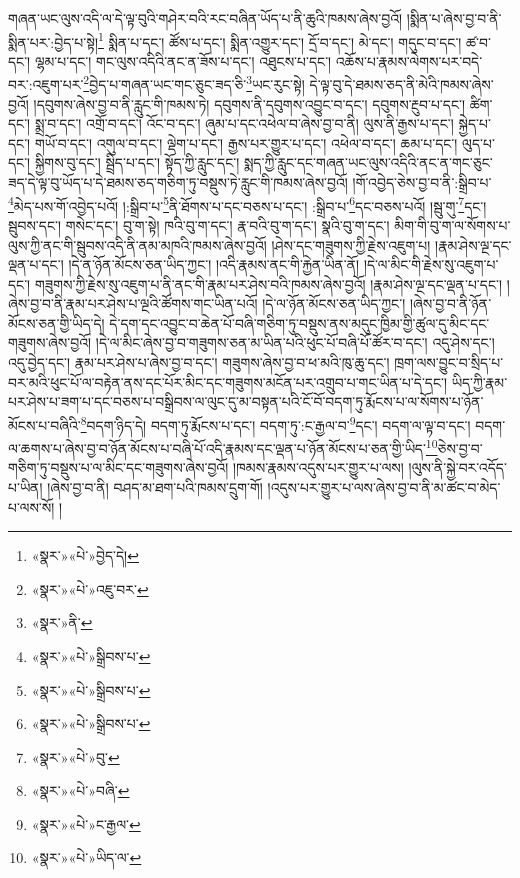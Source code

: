 གཞན་ཡང་ལུས་འདི་ལ་དེ་ལྟ་བུའི་གཤེར་བའི་རང་བཞིན་ཡོད་པ་ནི་ཆུའི་ཁམས་ཞེས་བྱའོ། །སྨིན་པ་ཞེས་བྱ་བ་ནི་སྨིན་པར་:བྱེད་པ་སྟེ།\footnote{«སྣར་»«པེ་»བྱེད་དེ།} སྨིན་པ་དང་། ཚོས་པ་དང་། སྨིན་འགྱུར་དང་། དྲོ་བ་དང་། མེ་དང་། གདུང་བ་དང་། ཚ་བ་དང་། ལྷམ་པ་དང་། གང་ལུས་འདིའི་ནང་ན་ཟོས་པ་དང་། འཐུངས་པ་དང་། འཆོས་པ་རྣམས་ལེགས་པར་བདེ་བར་:འཇུག་པར་\footnote{«སྣར་»«པེ་»འཇུ་བར་}བྱེད་པ་གཞན་ཡང་གང་ཅུང་ཟད་ཅི་\footnote{«སྣར་»ནི་}ཡང་རུང་སྟེ། དེ་ལྟ་བུ་དེ་ཐམས་ཅད་ནི་མེའི་ཁམས་ཞེས་བྱའོ། །དབུགས་ཞེས་བྱ་བ་ནི་རླུང་གི་ཁམས་ཏེ། དབུགས་ནི་དབུགས་འབྱུང་བ་དང་། དབུགས་རྔུབ་པ་དང་། ཚིག་དང་། སྨྲ་བ་དང་། འགྲོ་བ་དང་། འོང་བ་དང་། ཞུམ་པ་དང་འཕེལ་བ་ཞེས་བྱ་བ་ནི། ལུས་ནི་རྒྱས་པ་དང་། སྐྱེད་པ་དང་། གཡོ་བ་དང་། འགུལ་བ་དང་། ལྡེག་པ་དང་། རྒྱས་པར་གྱུར་པ་དང་། འཕེལ་བ་དང་། ཆམ་པ་དང་། ལུད་པ་དང་། སྐྱིགས་བུ་དང་། སྦྲིད་པ་དང་། སྟོད་ཀྱི་རླུང་དང་། སྨད་ཀྱི་རླུང་དང་གཞན་ཡང་ལུས་འདིའི་ནང་ན་གང་ཅུང་ཟད་དེ་ལྟ་བུ་ཡོད་པ་དེ་ཐམས་ཅད་གཅིག་ཏུ་བསྡུས་ཏེ་རླུང་གི་ཁམས་ཞེས་བྱའོ། །གོ་འབྱེད་ཅེས་བྱ་བ་ནི་:སྒྲིབ་པ་\footnote{«སྣར་»«པེ་»སྒྲིབས་པ་}མེད་པས་གོ་འབྱེད་པའོ། །:སྒྲིབ་པ་\footnote{«སྣར་»«པེ་»སྒྲིབས་པ་}ནི་ཐོགས་པ་དང་བཅས་པ་དང་། :སྒྲིབ་པ་\footnote{«སྣར་»«པེ་»སྒྲིབས་པ་}དང་བཅས་པའོ། །སྦུ་གུ་\footnote{«སྣར་»«པེ་»བུ་}དང་། སྦུབས་དང་། གསེང་དང་། བུ་ག་སྟེ། ཁའི་བུ་ག་དང་། རྣ་བའི་བུ་ག་དང་། སྣའི་བུ་ག་དང་། མིག་གི་བུ་ག་ལ་སོགས་པ་ལུས་ཀྱི་ནང་གི་སྦུབས་འདི་ནི་ནམ་མཁའི་ཁམས་ཞེས་བྱའོ། །ཤེས་དང་གཟུགས་ཀྱི་རྗེས་འཇུག་པ། །རྣམ་ཤེས་ལྔ་དང་ལྡན་པ་དང་། །དེ་ན་ཉོན་མོངས་ཅན་ཡིད་ཀྱང་། །འདི་རྣམས་ནང་གི་རྐྱེན་ཡིན་ནོ། །དེ་ལ་མིང་གི་རྗེས་སུ་འཇུག་པ་དང་། གཟུགས་ཀྱི་རྗེས་སུ་འཇུག་པ་ནི་ནང་གི་རྣམ་པར་ཤེས་བའི་ཁམས་ཞེས་བྱའོ། །རྣམ་ཤེས་ལྔ་དང་ལྡན་པ་དང་། །ཞེས་བྱ་བ་ནི་རྣམ་པར་ཤེས་པ་ལྔའི་ཚོགས་གང་ཡིན་པའོ། །དེ་ལ་ཉོན་མོངས་ཅན་ཡིད་ཀྱང་། །ཞེས་བྱ་བ་ནི་ཉོན་མོངས་ཅན་གྱི་ཡིད་དེ། དེ་དག་དང་འབྱུང་བ་ཆེན་པོ་བཞི་གཅིག་ཏུ་བསྡུས་ནས་མདུང་ཁྱིམ་གྱི་ཚུལ་དུ་མིང་དང་གཟུགས་ཞེས་བྱའོ། །དེ་ལ་མིང་ཞེས་བྱ་བ་གཟུགས་ཅན་མ་ཡིན་པའི་ཕུང་པོ་བཞི་པོ་ཚོར་བ་དང་། འདུ་ཤེས་དང་། འདུ་བྱེད་དང་། རྣམ་པར་ཤེས་པ་ཞེས་བྱ་བ་དང་། གཟུགས་ཞེས་བྱ་བ་ཕ་མའི་ཁུ་ཆུ་དང་། ཁྲག་ལས་བྱུང་བ་སྲིད་པ་བར་མའི་ཕུང་པོ་ལ་བརྟེན་ནས་དང་པོར་མིང་དང་གཟུགས་མངོན་པར་འགྲུབ་པ་གང་ཡིན་པ་དེ་དང་། ཡིད་ཀྱི་རྣམ་པར་ཤེས་པ་ཟག་པ་དང་བཅས་པ་བསྒྲིབས་ལ་ལུང་དུ་མ་བསྟན་པའི་ངོ་བོ་བདག་ཏུ་རྨོངས་པ་ལ་སོགས་པ་ཉོན་མོངས་པ་བཞིའི་\footnote{«སྣར་»«པེ་»བཞི་}བདག་ཉིད་དེ། བདག་ཏུ་རྨོངས་པ་དང་། བདག་ཏུ་:ང་རྒྱལ་བ་\footnote{«སྣར་»«པེ་»ང་རྒྱལ་}དང་། བདག་ལ་ལྟ་བ་དང་། བདག་ལ་ཆགས་པ་ཞེས་བྱ་བ་ཉོན་མོངས་པ་བཞི་པོ་འདི་རྣམས་དང་ལྡན་པ་ཉོན་མོངས་པ་ཅན་གྱི་ཡིད་\footnote{«སྣར་»«པེ་»ཡིད་ལ་}ཅེས་བྱ་བ་གཅིག་ཏུ་བསྡུས་པ་ལ་མིང་དང་གཟུགས་ཞེས་བྱའོ། །ཁམས་རྣམས་འདུས་པར་གྱུར་པ་ལས། །ལུས་ནི་སྐྱེ་བར་འདོད་པ་ཡིན། །ཞེས་བྱ་བ་ནི། བཤད་མ་ཐག་པའི་ཁམས་དྲུག་གོ། །འདུས་པར་གྱུར་པ་ལས་ཞེས་བྱ་བ་ནི་མ་ཚང་བ་མེད་པ་ལས་སོ། །
